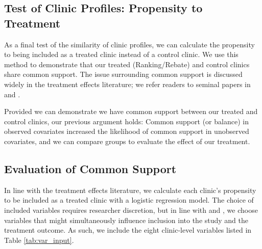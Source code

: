 \subsection{Test of Clinic Profiles: Propensity to Treatment}
As a final test of the similarity of clinic profiles, we can calculate the propensity to being included as a treated clinic instead of a control clinic. We use this method to demonstrate that our treated (Ranking/Rebate) and control clinics share common support. The issue surrounding common support is discussed widely in the treatment effects literature; we refer readers to seminal papers in \cite{Caliendo2008} and \cite{Stuart2010}. 

Provided we can demonstrate we have common support between our treated and control clinics, our previous argument holds: Common support (or balance) in observed covariates increased the likelihood of common support in unobserved covariates, and we can compare groups to evaluate the effect of our treatment.

\subsection*{Evaluation of Common Support} 
In line with the treatment effects literature, we calculate each clinic’s propensity to be included as a treated clinic with a logistic regression model. The choice of included variables requires researcher discretion, but in line with \cite{Caliendo2008} and \cite{Angrist2009}, we choose variables that might simultaneously influence inclusion into the study and the treatment outcome. As such, we include the eight clinic-level variables listed in Table \ref{tab:var_input}. 

\begin{table}[htbp]
\end{table}%

